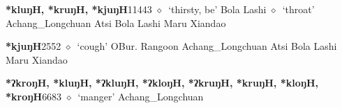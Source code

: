   \begin{list}{}{\leftmargin=1.5em \itemindent=-1.5em}
  \item {\footnotesize \textbf{*kluŋH, *kruŋH, *kjuŋH}}{\tiny 11443}
         $\diamond$~`thirsty, be'
         Bola 
\hspace{1ex}
         Lashi 
\hspace{1ex}
         $\diamond$~`throat'
         Achang\_Longchuan 
\hspace{1ex}
         Atsi 
\hspace{1ex}
         Bola 
\hspace{1ex}
         Lashi 
\hspace{1ex}
         Maru 
\hspace{1ex}
         Xiandao 
  \item {\footnotesize \textbf{*kjuŋH}}{\tiny 2552}
\hspace{1ex}
         $\diamond$~`cough'
         OBur. 
\hspace{1ex}
         Rangoon 
\hspace{1ex}
         Achang\_Longchuan 
\hspace{1ex}
         Atsi 
\hspace{1ex}
         Bola 
\hspace{1ex}
         Lashi 
\hspace{1ex}
         Maru 
\hspace{1ex}
         Xiandao 
  \item {\footnotesize \textbf{*ʔkroŋH, *kluŋH, *ʔkluŋH, *ʔkloŋH, *ʔkruŋH, *kruŋH, *kloŋH, *kroŋH}}{\tiny 6683}
\hspace{1ex}
         $\diamond$~`manger'
         Achang\_Longchuan 

\end{list}

